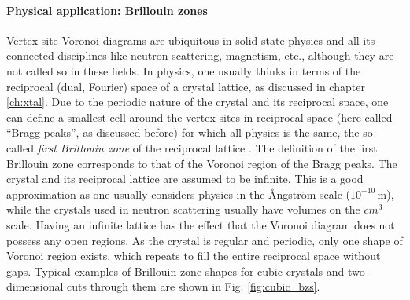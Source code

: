 \paragraph{Physical application: Brillouin zones}
Vertex-site Voronoi diagrams are ubiquitous in solid-state physics and all its connected disciplines
like neutron scattering, magnetism, etc., although they are not called so in these fields.
In physics, one usually thinks in terms of the reciprocal (dual, Fourier) space of a crystal lattice, as discussed
in chapter \ref{ch:xtal}. Due to the periodic nature of the crystal and its reciprocal space, one can define a smallest
cell around the vertex sites in reciprocal space (here called ``Bragg peaks'', as discussed before) for which all physics is 
the same, the so-called \textit{first Brillouin zone} of the reciprocal lattice \cite[pp. 63-64]{Gross2012}. 
The definition of the first Brillouin zone corresponds to that of the Voronoi region of the Bragg peaks.
The crystal and its reciprocal lattice are assumed to be infinite. This is a good approximation as one usually
considers physics in the \AA{}ngstr\"om scale ($10^{-10}\,\mathrm{m}$), while the crystals used in neutron scattering usually have volumes on the
$cm^3$ scale. Having an infinite lattice has the effect that the Voronoi diagram does not possess any open regions.
As the crystal is regular and periodic, only one shape of Voronoi region exists, which repeats to fill the
entire reciprocal space without gaps.
Typical examples of Brillouin zone shapes for cubic crystals and two-dimensional cuts through them 
are shown in Fig. \ref{fig:cubic_bzs}.

